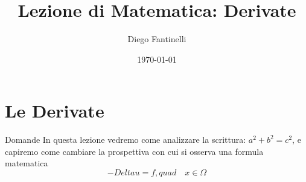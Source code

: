 \documentclass{beamer}
\title{Lezione di Matematica: Derivate}
\date{\today}
\author{Diego Fantinelli}
\institute{Matematica per il Liceo}
\begin{document}
\maketitle
\section{Le Derivate}


\begin{frame}{Domande}
In questa lezione vedremo come analizzare la scrittura: $a^2+b^2=c^2$, e capiremo come cambiare la prospettiva con cui si osserva una formula matematica\\

\[
-Delta u=f, quad \quad x\in\Omega
\]
\end{frame}
\end{document}
